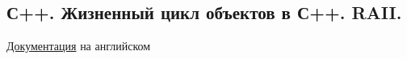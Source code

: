 \subsection{С++. Жизненный цикл объектов в С++. RAII.}
\href{https://docs.microsoft.com/en-us/cpp/cpp/object-lifetime-and-resource-management-modern-cpp?view=msvc-170}{Документация} на английском